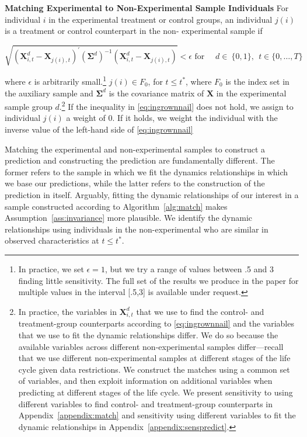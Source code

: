 \onehalfspacing
\begin{algorithm} \textbf{Matching Experimental to Non-Experimental Sample Individuals} \label{alg:match}
For individual $i$ in the experimental treatment or control groups, an individual $j(i)$ is a treatment or control counterpart in the non- experimental sample if

\begin{equation}\label{eq:ingrownnail}
\sqrt{\left( \bm{X}^{d}_{i,t} - \bm{X}_{j(i),t} \right)^{\prime} {\left( \bm{\Sigma}^d\right)}^{-1} \left(\bm{X}^{d}_{i,t} - \bm{X}_{j(i),t} \right)} < \epsilon \text{ for } \quad d \in \ \{0,1\}, \ \ t \in \{0,\dots,T\}
\end{equation}

\noindent where $\epsilon$ is arbitrarily small.\footnote{In practice, we set $\epsilon = 1$, but we try a range of values between .5 and 3 finding little sensitivity. The full set of the results we produce in the paper for multiple values in the interval [.5,3] is available under request.} $j(i) \in F_0$, for $t \leq t^{\ast}$, where $F_0$ is the index set in the auxiliary sample and $\bm{\Sigma}^d$ is the covariance matrix of $\bm{X}$ in the experimental sample group $d$.\footnote{In practice, the variables in $\bm{X}^{d}_{i,t}$ that we use to find the control- and treatment-group counterparts according to \eqref{eq:ingrownnail} and the variables that we use to fit the dynamic relationships differ. We do so because the available variables across different non-experimental samples differ---recall that we use different non-experimental samples at different stages of the life cycle given data restrictions. We construct the matches using a common set of variables, and then exploit information on additional variables when predicting at different stages of the life cycle. We present sensitivity to using different variables to find control- and treatment-group counterparts in Appendix~\ref{appendix:match} and sensitivity using different variables to fit the dynamic relationships in Appendix~\ref{appendix:senspredict}.} If the inequality in \eqref{eq:ingrownnail} does not hold, we assign to individual $j(i)$ a weight of 0. If it holds, we weight the individual with the inverse value of the left-hand side of \eqref{eq:ingrownnail}
\end{algorithm}
\doublespacing

\noindent Matching the experimental and non-experimental samples to construct a prediction and constructing the prediction are fundamentally different. The former refers to the sample in which we fit the dynamics relationships in which we base our predictions, while the latter refers to the construction of the prediction in itself. Arguably, fitting the dynamic relationships of our interest in a sample constructed according to Algorithm~\ref{alg:match} makes Assumption~\ref{ass:invariance} more plausible. We identify the dynamic relationships using individuals in the non-experimental who are similar in observed characteristics at $t \leq t^*$.\\

